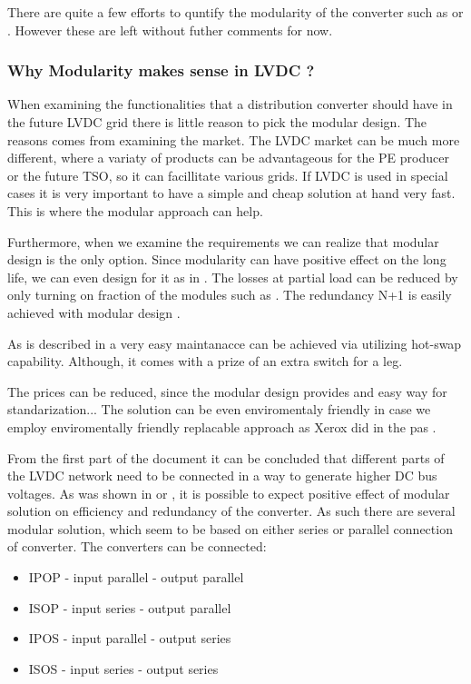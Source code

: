 \documentclass[]{scrartcl}
\begin{document}
There are quite a few efforts to quntify the modularity of the converter such as \cite{Huang1998} or \cite{Ji2012}. However these are left without futher comments for now. 

\subsubsection{Why Modularity makes sense in LVDC ?}

When examining the functionalities that a distribution converter should have in the future LVDC grid there is little reason to pick the modular design. The reasons comes from examining the market. The LVDC market can be much more different, where a variaty of products can be advantageous for the PE producer or the future TSO, so it can facillitate various grids. If LVDC is used in special cases it is very important to have a simple and cheap solution at hand very fast. This is where the modular approach can help. 

Furthermore, when we examine the requirements we can realize that modular design is the only option. Since modularity can have positive effect on the long life, we can even design for it as in \cite{Newcomb1996}. The losses at partial load can be reduced by only turning on fraction of the modules such as \cite{Liserre2016a}. The redundancy N+1 is easily achieved with modular design \cite{Doncker2014}. 

As is described in \cite{Cottet2015} a very easy maintanacce can be achieved via utilizing hot-swap capability. Although, it comes with a prize of an extra switch for a leg. 

The prices can be reduced, since the modular design provides and easy way for standarization... The solution can be even enviromentaly friendly in case we employ enviromentally friendly replacable approach as Xerox did in the pas \cite{Ulrich2004}.



From the first part of the document it can be concluded that different parts of the LVDC network need to be connected in a way to generate higher DC bus voltages. As was shown in \cite{Yang2014} or \cite{Quartarone}, it is possible to expect positive effect of modular solution on efficiency and redundancy of the converter. As such there are several modular solution, which seem to be based on either series or parallel connection of converter. The converters can be connected:
\begin{itemize}
	\item IPOP - input parallel - output parallel
	\item ISOP - input series - output parallel
	\item IPOS - input parallel - output series
	\item ISOS - input series - output series
\end{itemize}
\end{document}
